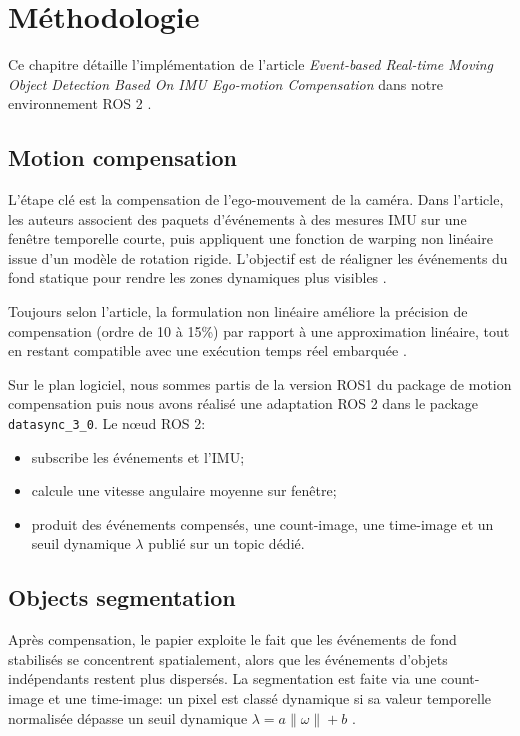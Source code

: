 \chapter{Méthodologie}

Ce chapitre détaille l'implémentation de l'article
\textit{Event-based Real-time Moving Object Detection Based On IMU Ego-motion
Compensation} dans notre environnement ROS 2 \cite{zhao2023imo}.

\section{Motion compensation}
L'étape clé est la compensation de l'ego-mouvement de la caméra. Dans
l'article, les auteurs associent des paquets d'événements à des mesures IMU sur
une fenêtre temporelle courte, puis appliquent une fonction de warping non
linéaire issue d'un modèle de rotation rigide. L'objectif est de réaligner les
événements du fond statique pour rendre les zones dynamiques plus visibles
\cite{zhao2023imo}.

Toujours selon l'article, la formulation non linéaire améliore la précision de
compensation (ordre de 10 à 15\%) par rapport à une approximation linéaire,
tout en restant compatible avec une exécution temps réel embarquée
\cite{zhao2023imo}.

Sur le plan logiciel, nous sommes partis de la version ROS1 du package de
motion compensation puis nous avons réalisé une adaptation ROS 2 dans le
package \texttt{datasync\_3\_0}. Le nœud ROS 2:
\begin{itemize}
\item subscribe les événements et l'IMU;
\item calcule une vitesse angulaire moyenne sur fenêtre;
\item produit des événements compensés, une count-image, une time-image et un
seuil dynamique $\lambda$ publié sur un topic dédié.
\end{itemize}

\section{Objects segmentation}
Après compensation, le papier exploite le fait que les événements de fond
stabilisés se concentrent spatialement, alors que les événements d'objets
indépendants restent plus dispersés. La segmentation est faite via une
count-image et une time-image: un pixel est classé dynamique si sa valeur
temporelle normalisée dépasse un seuil dynamique $\lambda = a \lVert \omega
\rVert + b$ \cite{zhao2023imo}.

